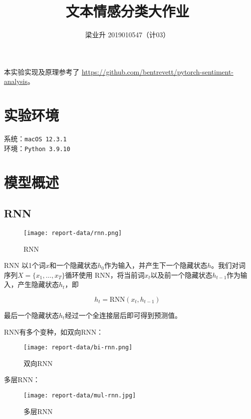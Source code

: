 \documentclass[a4paper]{article}
\begin{document}
\title{文本情感分类大作业}
\author{梁业升 2019010547（计03）}

\maketitle

本实验实现及原理参考了 \url{https://github.com/bentrevett/pytorch-sentiment-analysis}。

\section*{实验环境}

系统：\texttt{macOS 12.3.1}\\
环境：\texttt{Python 3.9.10}

\section{模型概述}

\subsection{RNN}

\begin{figure}[H]
    \centering
    \texttt{[image: report-data/rnn.png]}
    \caption{RNN}
\end{figure}

RNN 以1个词$x$和一个隐藏状态$h_0$作为输入，并产生下一个隐藏状态$h$。我们对词序列$X=\{x_1,\ldots,x_T\}$循环使用 RNN，将当前词$x_t$以及前一个隐藏状态$h_{t-1}$作为输入，产生隐藏状态$h_t$，即

\begin{equation}
    h_t=\textrm{RNN}(x_t,h_{t-1})
\end{equation}

最后一个隐藏状态$h_t$经过一个全连接层后即可得到预测值。

RNN有多个变种，如双向RNN：

\begin{figure}[H]
    \centering
    \texttt{[image: report-data/bi-rnn.png]}
    \caption{双向RNN}
\end{figure}

多层RNN：

\begin{figure}[H]
    \centering
    \texttt{[image: report-data/mul-rnn.jpg]}
    \caption{多层RNN}
\end{figure}
\end{document}
